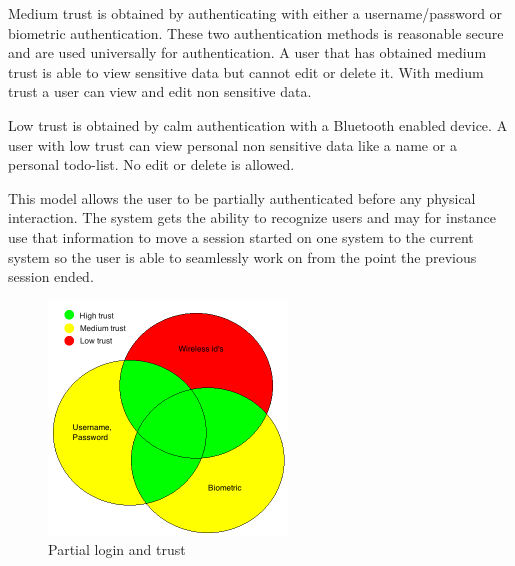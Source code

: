 Medium trust is obtained by authenticating with either a username/password or biometric authentication.
These two authentication methods is reasonable secure and are used universally for authentication.
A user that has obtained medium trust is able to view sensitive data but cannot edit or delete it.
With medium trust a user can view and edit non sensitive data.

Low trust is obtained by calm authentication with a Bluetooth enabled device.
A user with low trust can view personal non sensitive data like a name or a personal todo-list.
No edit or delete is allowed.

This model allows the user to be partially authenticated before any physical interaction.
The system gets the ability to recognize users and may for instance use that information to move a session started on one system to the current system so the user is able to seamlessly work on from the point the previous session ended.

\begin{figure}[!t]
	\centering
	\includegraphics[width=2.5in]{img/authenticationModel}
	\caption{ Partial login and trust }
	\label{fig_authentication_model}
\end{figure}